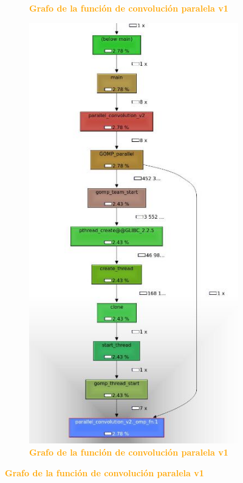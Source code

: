 \documentclass{article}
\begin{document}
\begin{figure}[H]
\begin{subfigure}[b]{0.50\textwidth}
     \caption{\textbf{\textcolor{Orange}{Grafo de la función de convolución paralela v1}}}
    \label{fig:41}
  \end{subfigure}
  \begin{subfigure}[b]{0.50\textwidth}
    \includegraphics[width=\textwidth]{figures/parallel2.jpg}
     \caption{\textbf{\textcolor{Orange}{Grafo de la función de convolución paralela v1}}}
    \label{fig:42}
  \end{subfigure}
\end{figure}
\end{document}

